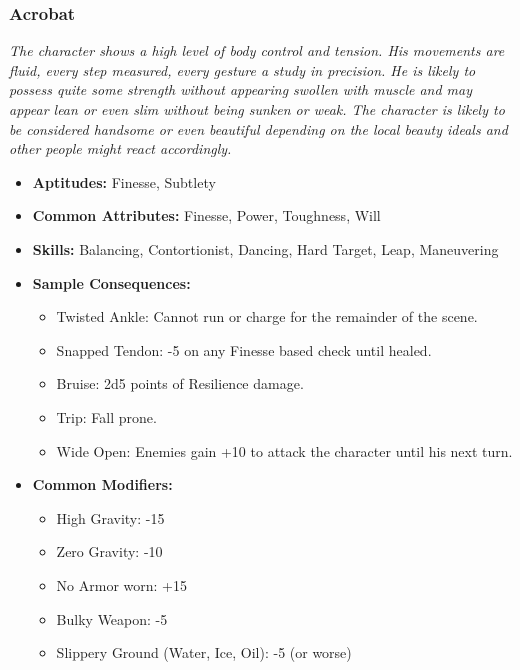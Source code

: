\subsubsection{Acrobat}\label{Acrobat}
\textit{The character shows a high level of body control and tension. 
His movements are fluid, every step measured, every gesture a study in precision.
He is likely to possess quite some strength without appearing swollen with muscle and may appear lean or even slim without being sunken or weak.
The character is likely to be considered handsome or even beautiful depending on the local beauty ideals and other people might react accordingly.}
\begin{itemize}
	\item \textbf{Aptitudes:} Finesse, Subtlety
	\item \textbf{Common Attributes:} Finesse, Power, Toughness, Will
	\item \textbf{Skills:} Balancing, Contortionist, Dancing, Hard Target, Leap, Maneuvering
	\item \textbf{Sample Consequences:} 
	\begin{itemize}
		\item Twisted Ankle: Cannot run or charge for the remainder of the scene.
		\item Snapped Tendon: -5 on any Finesse based check until healed.
		\item Bruise: 2d5 points of Resilience damage.
		\item Trip: Fall prone.
		\item Wide Open: Enemies gain +10 to attack the character until his next turn.
	\end{itemize}
	\item \textbf{Common Modifiers:}
	\begin{itemize}
		\item High Gravity: -15
		\item Zero Gravity: -10
		\item No Armor worn: +15
		\item Bulky Weapon: -5
		\item Slippery Ground (Water, Ice, Oil): -5 (or worse)
	\end{itemize}
\end{itemize}

